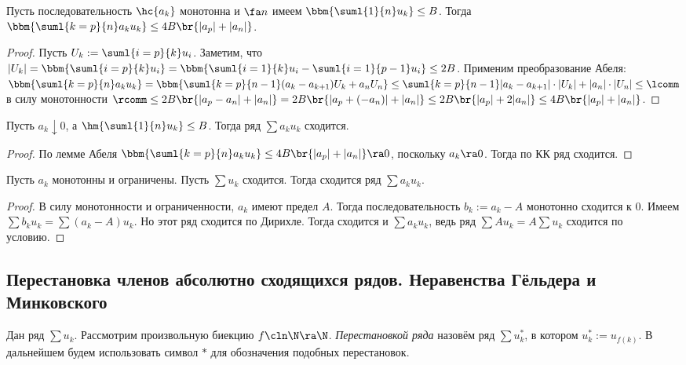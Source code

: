 \documentclass[a4paper]{article}
\begin{document}
\begin{theorem}Пусть последовательность $\hc{a_k}$ монотонна и $\fa n$ имеем $\bbm{\suml{1}{n}u_k} \le B$. Тогда
$\bbm{\suml{k=p}{n}a_ku_k} \le 4B\br{|a_p| + |a_n|}$.
\end{theorem}
\begin{proof}
Пусть $U_k := \suml{i=p}{k}u_i$. Заметим, что $|U_k|=\bbm{\suml{i=p}{k}u_i} =\bbm{\suml{i=1}{k}u_i-\suml{i=1}{p-1}u_i} \le 2B$.
Применим преобразование Абеля: $\bbm{\suml{k=p}{n}a_ku_k} = \bbm{\suml{k=p}{n-1}(a_k-a_{k+1})U_k +
a_nU_n} \le \suml{k=p}{n-1}|a_k-a_{k+1}|\cdot|U_k| + |a_n|\cdot|U_n| \le \lcomm$ в силу монотонности $\rcomm \le
2B\br{|a_p-a_n| + |a_n|} = 2B\br{|a_p +(-a_n)| + |a_n|} \le 2B\br{|a_p| + 2|a_n|} \le 4B\br{|a_p| + |a_n|}$.
\end{proof}

\begin{theorem}
Пусть $a_k \downarrow 0$, а $\hm{\suml{1}{n}u_k} \le B$. Тогда ряд $\sum a_ku_k$ сходится.
\end{theorem}
\begin{proof}
По лемме Абеля $\bbm{\suml{k=p}{n}a_ku_k} \le 4B\br{|a_p| + |a_n|} \ra 0$, поскольку $a_k \ra 0$. Тогда по КК ряд сходится.
\end{proof}

\begin{theorem}
Пусть $a_k$ монотонны и ограничены. Пусть $\sum u_k$ сходится. Тогда сходится ряд $\sum a_ku_k$.
\end{theorem}
\begin{proof}
В силу монотонности и ограниченности, $a_k$ имеют предел $A$. Тогда последовательность $b_k := a_k-A$ монотонно сходится к 0.
Имеем $\sum b_ku_k = \sum (a_k -A)u_k$. Но этот ряд сходится по Дирихле. Тогда сходится и $\sum a_ku_k$, ведь ряд $\sum Au_k=A\sum u_k$
сходится по условию.
\end{proof}

\subsection{Перестановка членов абсолютно сходящихся рядов. Неравенства Гёльдера и Минковского}

\begin{df}
Дан ряд $\sum u_k$. Рассмотрим произвольную биекцию $f\cln \N \ra \N$. \emph{Перестановкой ряда} назовём
ряд $\sum u_k^*$, в котором $u_k^* :=u_{f(k)}$. В дальнейшем будем использовать символ $*$ для обозначения подобных перестановок.
\end{df}
\end{document}

